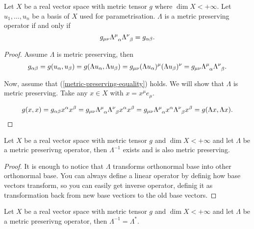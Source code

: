 \documentclass[main.tex]{subfiles}
\begin{document}
\begin{theorem}
Let $X$ be a real vector space with metric tensor $g$ where $\dim X < +\infty$. Let $u_1, \dots, u_n$ be a basis of $X$ used for parametrisation. $\Lambda$ is a metric preserving operator if and only if
\begin{equation}
\label{metric-preserving-equality}
g_{\mu\nu} \tensor{\Lambda}{^\mu_\alpha} \tensor{\Lambda}{^\nu_\beta} = g_{\alpha\beta}. 
\end{equation}
\end{theorem}
\begin{proof}
Assume $\Lambda$ is metric preserving, then
\begin{align}
g_{\alpha\beta} = g(u_\alpha, u_\beta) = g(\Lambda u_\alpha, \Lambda u_\beta) = 
g_{\mu\nu} (\Lambda u_\alpha)^\mu (\Lambda u_\beta)^\nu = g_{\mu\nu} \tensor{\Lambda}{^\mu_\alpha}\tensor{\Lambda}{^\nu_\beta}.
\end{align}

Now, assume that (\ref{metric-preserving-equality}) holds. We will show that $\Lambda$ is metric preserving. Take any $x\in X$ with $x = x^\mu e_\mu$.

\begin{align}
g(x, x) = g_{\alpha\beta} x^\alpha x^\beta 
= g_{\mu\nu} \tensor{\Lambda}{^\mu_\alpha}\tensor{\Lambda}{^\nu_\beta} x^\alpha x^\beta =  g_{\mu\nu} \tensor{\Lambda}{^\mu_\alpha} x^\alpha\tensor{\Lambda}{^\nu_\beta} x^\beta = g(\Lambda x, \Lambda x).
\end{align}
\end{proof}

\begin{theorem}
\label{metric-preserving-inverse-existence}
Let $X$ be a real vector space with metric tensor $g$ and $\dim X < +\infty$ and let $\Lambda$ be a metric preserivng operator, then $\Lambda^{-1}$ exists and is also metric preserving.
\end{theorem}

\begin{proof}
It is enough to notice that $\Lambda$ transforms orthonormal base into other orthonormal base. You can always define a linear operator by definig how base vectors transform, so you can easily get inverse operator, definig it as transformation back from new base vectiors to the old base vectors. 
\end{proof}

\begin{theorem}
Let $X$ be a real vector space with metric tensor $g$ and $\dim X < +\infty$ and let $\Lambda$ be a metric preserivng operator, then $\Lambda^{-1} = \Lambda^*$.
\end{theorem}
\end{document}
